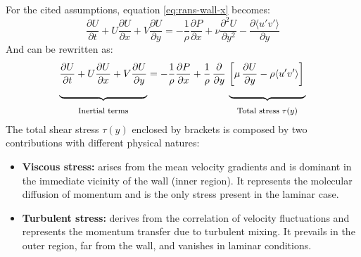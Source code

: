\documentclass[12pt, a4paper, twoside, openright]{book}
\begin{document}
For the cited assumptions, equation \eqref{eq:rans-wall-x} becomes:
\begin{equation}
	\frac{\partial U}{\partial t} + U \frac{\partial U}{\partial x} + V \frac{\partial U}{\partial y} =
	-\frac{1}{\rho} \frac{\partial P}{\partial x}
	+ \nu \frac{\partial^2 U}{\partial y^2}
	- \frac{\partial \langle u'v' \rangle}{\partial y}
	\label{eq:rans-tble}
\end{equation}
And can be rewritten as:
\begin{equation}
	\underbrace{
		\frac{\partial U}{\partial t} + U \frac{\partial U}{\partial x} + V \frac{\partial U}{\partial y}
		\vphantom{\frac{\partial}{\partial y} \left[ \frac{\partial U}{\partial y} \right]}
		\rule[-18pt]{0pt}{0pt}
	}_{\raisebox{-6pt}{\text{\footnotesize Inertial terms}}}
	=
	-\frac{1}{\rho} \frac{\partial P}{\partial x}
	+
	\frac{1}{\rho} \, \frac{\partial}{\partial y} \, \underbrace{ \left[ \mu \, \frac{\partial U}{\partial y} - \rho \langle u'v' \rangle \right]
		\rule[-18pt]{0pt}{0pt}
	}_{\raisebox{-6pt}{\text{\footnotesize Total stress $\tau(y)$}}}
	\label{eq:tble}
\end{equation}
The total shear stress $\tau(y)$ enclosed by brackets is composed by two contributions with different physical natures:
\begin{itemize}
	\item \textbf{Viscous stress:} arises from the mean velocity gradients and is dominant in the immediate vicinity of the wall (inner region). It represents the molecular diffusion of momentum and is the only stress present in the laminar case.
	\item \textbf{Turbulent stress:} derives from the correlation of velocity fluctuations and represents the momentum transfer due to turbulent mixing. It prevails in the outer region, far from the wall, and vanishes in laminar conditions.
\end{itemize}
\end{document}
